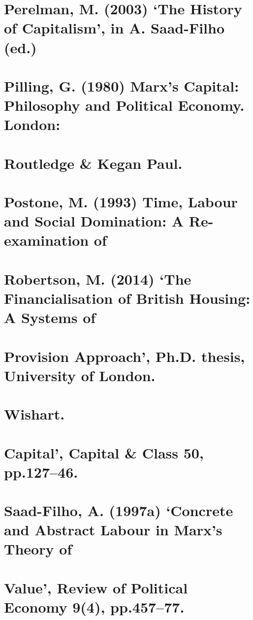 \section{Perelman, M. (2003) ‘The History of Capitalism’, in A. Saad-Filho (ed.)}


\section{Pilling, G. (1980) Marx’s Capital: Philosophy and Political Economy. London:}


\section{Routledge & Kegan Paul.}


\section{Postone, M. (1993) Time, Labour and Social Domination: A Re-examination of}


\section{Robertson, M. (2014) ‘The Financialisation of British Housing: A Systems of}


\section{Provision Approach’, Ph.D. thesis, University of London.}


\section{Wishart.}


\section{Capital’, Capital & Class 50, pp.127–46.}


\section{Saad-Filho, A. (1997a) ‘Concrete and Abstract Labour in Marx’s Theory of}


\section{Value’, Review of Political Economy 9(4), pp.457–77.}


